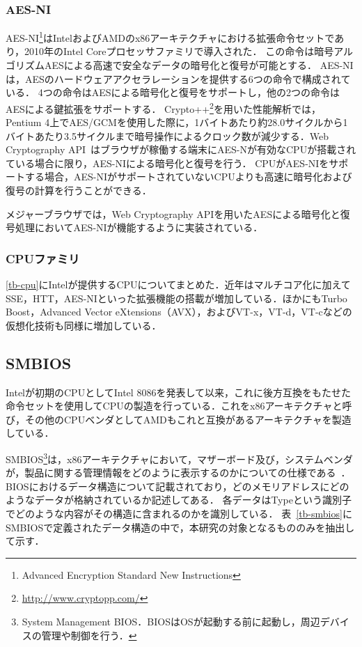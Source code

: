\subsubsection{AES-NI}
AES-NI\footnote{Advanced Encryption Standard New Instructions}はIntelおよびAMDのx86アーキテクチャにおける拡張命令セットであり，2010年のIntel Coreプロセッサファミリで導入された．
この命令は暗号アルゴリズムAESによる高速で安全なデータの暗号化と復号が可能とする．
AES-NIは，AESのハードウェアアクセラレーションを提供する6つの命令で構成されている．
4つの命令はAESによる暗号化と復号をサポートし，他の2つの命令はAESによる鍵拡張をサポートする．
Crypto++\footnote{\url{http://www.cryptopp.com/}}を用いた性能解析では，Pentium 4上でAES/GCMを使用した際に，1バイトあたり約28.0サイクルから1バイトあたり3.5サイクルまで暗号操作によるクロック数が減少する．Web Cryptography API~\cite{web_crypto}はブラウザが稼働する端末にAES-Nが有効なCPUが搭載されている場合に限り，AES-NIによる暗号化と復号を行う．
CPUがAES-NIをサポートする場合，AES-NIがサポートされていないCPUよりも高速に暗号化および復号の計算を行うことができる．

メジャーブラウザでは，Web Cryptography APIを用いたAESによる暗号化と復号処理においてAES-NIが機能するように実装されている．

\subsubsection{CPUファミリ}
\ref{tb-cpu}にIntelが提供するCPUについてまとめた．近年はマルチコア化に加えてSSE，HTT，AES-NIといった拡張機能の搭載が増加している．ほかにもTurbo Boost，Advanced Vector eXtensions（AVX），およびVT-x，VT-d，VT-cなどの仮想化技術も同様に増加している．
\subsection{SMBIOS}
Intelが初期のCPUとしてIntel 8086を発表して以来，これに後方互換をもたせた命令セットを使用してCPUの製造を行っている．これをx86アーキテクチャと呼び，その他のCPUベンダとしてAMDもこれと互換があるアーキテクチャを製造している．

SMBIOS\footnote{System Management BIOS．BIOSはOSが起動する前に起動し，周辺デバイスの管理や制御を行う．}は，x86アーキテクチャにおいて，マザーボード及び，システムベンダが，製品に関する管理情報をどのように表示するのかについての仕様である~\cite{smbios_spec}．
BIOSにおけるデータ構造について記載されており，どのメモリアドレスにどのようなデータが格納されているか記述してある．
各データはTypeという識別子でどのような内容がその構造に含まれるのかを識別している．
表~\ref{tb-smbios}にSMBIOSで定義されたデータ構造の中で，本研究の対象となるもののみを抽出して示す．


